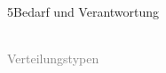 \documentclass[xcolor=table,9pt,aspectratio=169]{beamer}
\begin{document}
\begin{frame}{\vspace*{10mm}5\hspace*{1em}Bedarf und Verantwortung}
\begin{center}
   \\
   \textcolor{gray}{Verteilungstypen}
\end{center}
\end{frame}
\end{document}
